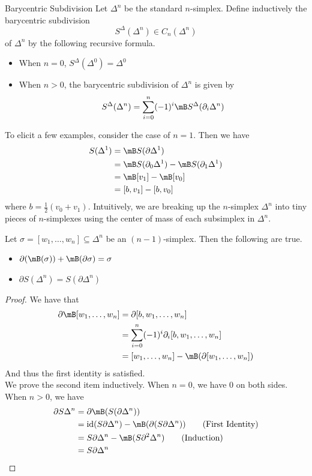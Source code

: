 \documentclass[a4paper]{article}
\begin{document}
\begin{defn}{Barycentric Subdivision}{} Let $\Delta^n$ be the standard $n$-simplex. Define inductively the barycentric subdivision $$S^\Delta(\Delta^n)\in C_n(\Delta^n)$$ of $\Delta^n$ by the following recursive formula. 
\begin{itemize}
\item When $n=0$, $S^\Delta(\Delta^0)=\Delta^0$
\item When $n>0$, the barycentric subdivision of $\Delta^n$ is given by $$S^\Delta(\Delta^n)=\sum_{i=0}^n(-1)^i\mB S^\Delta(\partial_i\Delta^n)$$
\end{itemize}
\end{defn}

To elicit a few examples, consider the case of $n=1$. Then we have 
\begin{align*}
S(\Delta^1)&=\mB S(\partial\Delta^1)\\
&=\mB S(\partial_0\Delta^1)-\mB S(\partial_1\Delta^1)\\
&=\mB[v_1]-\mB[v_0]\\
&=[b,v_1]-[b,v_0]
\end{align*}
where $b=\frac{1}{2}(v_0+v_1)$. Intuitively, we are breaking up the $n$-simplex $\Delta^n$ into tiny pieces of $n$-simplexes using the center of mass of each subsimplex in $\Delta^n$. 

\begin{lmm}{}{} Let $\sigma=[w_1,\dots,w_n]\subseteq\Delta^n$ be an $(n-1)$-simplex. Then the following are true. 
\begin{itemize}
\item $\partial(\mB(\sigma))+\mB(\partial\sigma)=\sigma$ 
\item $\partial S(\Delta^n)=S(\partial\Delta^n)$
\end{itemize} 
\begin{proof}
We have that 
\begin{align*}
\partial\mB[w_1,\dots,w_n]&=\partial[b,w_1,\dots,w_n]\\
&=\sum_{i=0}^n(-1)^i\partial_i[b,w_1,\dots,w_n]\\
&=[w_1,\dots,w_n]-\mB(\partial[w_1,\dots,w_n])
\end{align*}
And thus the first identity is satisfied. \\
We prove the second item inductively. When $n=0$, we have $0$ on both sides. When $n>0$, we have
\begin{align*}
\partial S\Delta^n&=\partial\mB(S(\partial\Delta^n))\\
&=\text{id}(S\partial\Delta^n)-\mB(\partial(S\partial\Delta^n))\tag{First Identity}\\
&=S\partial\Delta^n-\mB(S\partial^2\Delta^n)\tag{Induction}\\
&=S\partial\Delta^n
\end{align*}
\end{proof}
\end{lmm}
\end{document}
